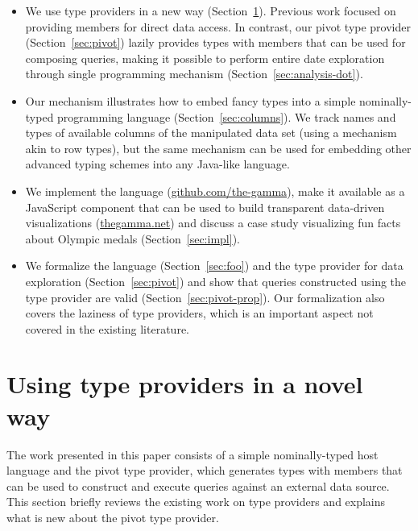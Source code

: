 \documentclass[a4paper,UKenglish]{lipics-v2016}
\theoremstyle{plain}
\theoremstyle{definition}
\begin{document}
\begin{itemize}
\item We use type providers in a new way (Section~\ref{sec:tps}). Previous work focused on providing 
  members for direct data access. In contrast, our pivot type provider (Section~\ref{sec:pivot}) lazily 
  provides types with members that can be used for composing queries, making it possible to perform
  entire date exploration through single programming mechanism (Section~\ref{sec:analysis-dot}).  

\item Our mechanism illustrates how to embed fancy types \cite{fancytypes} into a simple nominally-typed programming  
  language (Section~\ref{sec:columns}). We track names and types of available columns of the 
  manipulated data set (using a mechanism akin to row types), but the same mechanism can be used for 
  embedding other advanced typing schemes into any Java-like language.
  
\item We implement the language (\url{github.com/the-gamma}), make it available as a JavaScript 
  component that can be used to build transparent data-driven visualizations (\url{thegamma.net}) 
  and discuss a case study visualizing fun facts about Olympic medals (Section~\ref{sec:impl}).

\item We formalize the language (Section~\ref{sec:foo}) and the type provider for data exploration
  (Section~\ref{sec:pivot}) and show that queries constructed using the type provider are valid
  (Section~\ref{sec:pivot-prop}). Our formalization also covers the laziness of type providers, which
  is an important aspect not covered in the existing literature.
\end{itemize}


\section{Using type providers in a novel way}
\label{sec:tps}

The work presented in this paper consists of a simple nominally-typed host language and the pivot
type provider, which generates types with members that can be used to construct and execute queries
against an external data source. This section briefly reviews the existing work on type providers
and explains what is new about the pivot type provider.
\end{document}
